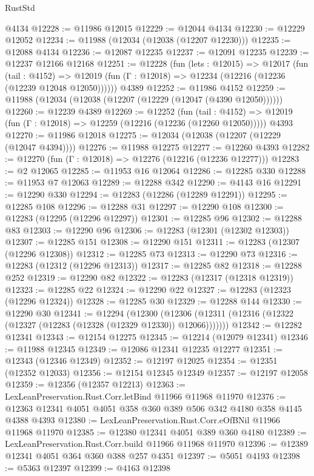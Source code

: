 \begin{lexlean}{RustStd}
\begin{coremodule}
    @4134
@12228 := @11986 @12015
@12229 := @12044 @4134
@12230 := @12229 @12052
@12234 := @11988 (@12034 (@12038 (@12207 @12230)))
@12235 := @12088 @4134
@12236 := @12087 @12235
@12237 := @12091 @12235
@12239 := @12237 @12166 @12168
@12251 := @12228
    (fun (lets : @12015) =>
    @12017
      (fun (tail : @4152) =>
      @12019 (fun (Γ : @12018) => @12234 (@12216 (@12236 (@12239 @12048 @12050))))))
    @4389
@12252 := @11986 @4152
@12259 := @11988 (@12034 (@12038 (@12207 (@12229 (@12047 (@4390 @12050))))))
@12260 := @12239 @4389
@12269 := @12252
    (fun (tail : @4152) => @12019 (fun (Γ : @12018) => @12259 (@12216 (@12236 (@12260 @12050)))))
    @4393
@12270 := @11986 @12018
@12275 := @12034 (@12038 (@12207 (@12229 (@12047 @4394))))
@12276 := @11988 @12275
@12277 := @12260 @4393
@12282 := @12270 (fun (Γ : @12018) => @12276 (@12216 (@12236 @12277)))
@12283 := @2 @12065
@12285 := @11953 @16 @12064
@12286 := @12285 @330
@12288 := @11953 @7 @12063
@12289 := @12288 @342
@12290 := @4143 @16
@12291 := @12290 @330
@12294 := @12283 (@12286 (@12289 @12291))
@12295 := @12285 @108
@12296 := @12288 @31
@12297 := @12290 @108
@12300 := @12283 (@12295 (@12296 @12297))
@12301 := @12285 @96
@12302 := @12288 @83
@12303 := @12290 @96
@12306 := @12283 (@12301 (@12302 @12303))
@12307 := @12285 @151
@12308 := @12290 @151
@12311 := @12283 (@12307 (@12296 @12308))
@12312 := @12285 @73
@12313 := @12290 @73
@12316 := @12283 (@12312 (@12296 @12313))
@12317 := @12285 @82
@12318 := @12288 @252
@12319 := @12290 @82
@12322 := @12283 (@12317 (@12318 @12319))
@12323 := @12285 @22
@12324 := @12290 @22
@12327 := @12283 (@12323 (@12296 @12324))
@12328 := @12285 @30
@12329 := @12288 @144
@12330 := @12290 @30
@12341 := @12294
    (@12300 (@12306 (@12311 (@12316 (@12322 (@12327 (@12283 (@12328 (@12329 @12330)) @12066)))))))
@12342 := @12282 @12341
@12343 := @12154 @12275
@12345 := @12214 (@12079 @12341)
@12346 := @11988 @12345
@12349 := @12086 @12341 @12235 @12277
@12351 := @12343 (@12346 @12349)
@12352 := @12197 @12025
@12354 := @12351 (@12352 @12033)
@12356 := @12154 @12345 @12349
@12357 := @12197 @12058
@12359 := @12356 (@12357 @12213)
@12363 := LexLeanPreservation.Rust.Corr.letBind @11966 @11968 @11970
@12376 := @12363 @12341 @4051 @4051 @358 @360 @389 @506 @342 @4180 @358 @4145 @4388 @4393
@12380 := LexLeanPreservation.Rust.Corr.eOfBNil @11966 @11968 @11970
@12385 := @12380 @12341 @4051 @389 @360 @4180
@12389 := LexLeanPreservation.Rust.Corr.build @11966 @11968 @11970
@12396 := @12389 @12341 @4051 @364 @360 @388 @257 @4351
@12397 := @5051 @4193
@12398 := @5363 @12397
@12399 := @4163 @12398

\end{coremodule}
\end{lexlean}
